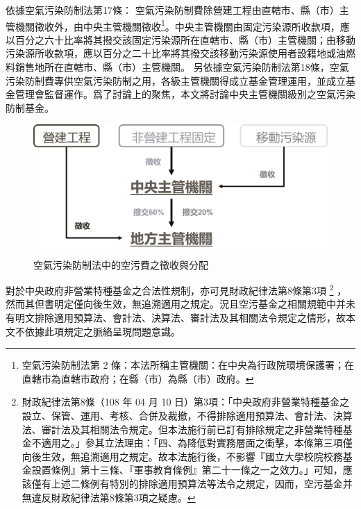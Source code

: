 \documentclass[12pt,a4paper]{article}
\begin{document}



依據空氣污染防制法第17條：
空氣污染防制費除營建工程由直轄市、縣（市）主管機關徵收外，由中央主管機關徵收\footnote{空氣污染防制法第 2 條：本法所稱主管機關：在中央為行政院環境保護署；在直轄市為直轄市政府；在縣（市）為縣（巿）政府。}。中央主管機關由固定污染源所收款項，應以百分之六十比率將其撥交該固定污染源所在直轄市、縣（市）主管機關；由移動污染源所收款項，應以百分之二十比率將其撥交該移動污染源使用者設籍地或油燃料銷售地所在直轄市、縣（市）主管機關。
另依據空氣污染防制法第18條，空氣污染防制費專供空氣污染防制之用，各級主管機關得成立基金管理運用，並成立基金管理會監督運作。爲了討論上的聚焦，本文將討論中央主管機關級別之空氣污染防制基金。


\begin{figure}[h]
  \centering
  \includegraphics[width=0.8\linewidth]{img/incomebw.png}
  \caption[空氣污染防制法中的空污費之徵收與分配]{空氣污染防制法中的空污費之徵收與分配 \footnotemark }
  \label{fig:income}
\end{figure}



對於中央政府非營業特種基金之合法性規制，亦可見財政紀律法第8條第3項
\footnote{財政紀律法第8條（108 年 04 月 10 日）第3項：「中央政府非營業特種基金之設立、保管、運用、考核、合併及裁撤，不得排除適用預算法、會計法、決算法、審計法及其相關法令規定。但本法施行前已訂有排除規定之非營業特種基金不適用之。」參其立法理由：「四、為降低對實務層面之衝擊，本條第三項僅向後生效，無追溯適用之規定。故本法施行後，不影響『國立大學校院校務基金設置條例』第十三條、『軍事教育條例』第二十一條之一之效力。」可知，應該僅有上述二條例有特別的排除適用預算法等法令之規定，因而，空污基金并無違反財政紀律法第8條第3項之疑慮。}
，然而其但書明定僅向後生效，無追溯適用之規定。況且空污基金之相關規範中并未有明文排除適用預算法、會計法、決算法、審計法及其相關法令規定之情形，故本文不依據此項規定之脈絡呈現問題意識。
\end{document}
